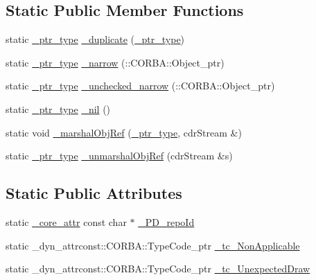 \subsection*{Static Public Member Functions}
\begin{DoxyCompactItemize}
\item 
static \hyperlink{class_draw_service_a452c5d2edf70f25bc3fb7027548adb90}{\+\_\+ptr\+\_\+type} \hyperlink{class_draw_service_a67f18fb236cd446b03b160acf64125f3}{\+\_\+duplicate} (\hyperlink{class_draw_service_a452c5d2edf70f25bc3fb7027548adb90}{\+\_\+ptr\+\_\+type})
\item 
static \hyperlink{class_draw_service_a452c5d2edf70f25bc3fb7027548adb90}{\+\_\+ptr\+\_\+type} \hyperlink{class_draw_service_adc06ca121635bcc66b18fdf89079b236}{\+\_\+narrow} (\+::C\+O\+R\+B\+A\+::\+Object\+\_\+ptr)
\item 
static \hyperlink{class_draw_service_a452c5d2edf70f25bc3fb7027548adb90}{\+\_\+ptr\+\_\+type} \hyperlink{class_draw_service_a7c98c12c713160b6e067214d5e9046ff}{\+\_\+unchecked\+\_\+narrow} (\+::C\+O\+R\+B\+A\+::\+Object\+\_\+ptr)
\item 
static \hyperlink{class_draw_service_a452c5d2edf70f25bc3fb7027548adb90}{\+\_\+ptr\+\_\+type} \hyperlink{class_draw_service_a06f3c379539862c0e199ed6a36fc5f4a}{\+\_\+nil} ()
\item 
static void \hyperlink{class_draw_service_a4b4dbca9f78fe084a3a340bb0f4dd9ee}{\+\_\+marshal\+Obj\+Ref} (\hyperlink{class_draw_service_a452c5d2edf70f25bc3fb7027548adb90}{\+\_\+ptr\+\_\+type}, cdr\+Stream \&)
\item 
static \hyperlink{class_draw_service_a452c5d2edf70f25bc3fb7027548adb90}{\+\_\+ptr\+\_\+type} \hyperlink{class_draw_service_aad9e95aa1b6f345b50a56f9136d67d48}{\+\_\+unmarshal\+Obj\+Ref} (cdr\+Stream \&s)
\end{DoxyCompactItemize}
\subsection*{Static Public Attributes}
\begin{DoxyCompactItemize}
\item 
static \hyperlink{_petit_prince_8hpp_a5f7bf7cddb608c2aad7c95f55f8a33c5}{\+\_\+core\+\_\+attr} const char $\ast$ \hyperlink{class_draw_service_afba77735caed0164a1f53ddec6a5095a}{\+\_\+\+P\+D\+\_\+repo\+Id}
\item 
static \+\_\+dyn\+\_\+attrconst\+::\+C\+O\+R\+B\+A\+::\+Type\+Code\+\_\+ptr \hyperlink{class_draw_service_a61c64267972c67512380625107b4c42b}{\+\_\+tc\+\_\+\+Non\+Applicable}
\item 
static \+\_\+dyn\+\_\+attrconst\+::\+C\+O\+R\+B\+A\+::\+Type\+Code\+\_\+ptr \hyperlink{class_draw_service_a20a8de19b0f9d322579bf636ca2dd1e6}{\+\_\+tc\+\_\+\+Unexpected\+Draw}
\end{DoxyCompactItemize}


